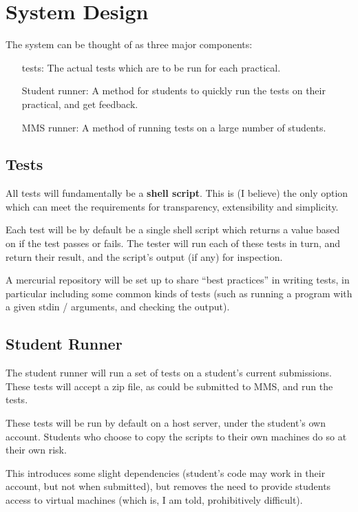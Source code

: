 \documentclass[11pt]{article}
\begin{document}
\section{System Design}

The system can be thought of as three major components:

\begin{itemize}
\item[tests:] The actual tests which are to be run for each practical.
\item[Student runner:] A method for students to quickly run the tests on their practical, and get feedback.
\item[MMS runner:] A method of running tests on a large number of students.
\end{itemize}



\subsection{Tests}

All tests will fundamentally be a \textbf{shell script}. This is (I believe) the only option which can meet the requirements for transparency, extensibility and simplicity.

Each test will be by default be a single shell script which returns a value based on if the test passes or fails. The tester will run each of these tests in turn, and return their result, and the script's output (if any) for inspection.

A mercurial repository will be set up to share ``best practices'' in writing tests, in particular including some common kinds of tests (such as running a program with a given stdin / arguments, and checking the output).

\subsection{Student Runner}

The student runner will run a set of tests on a student's current submissions. These tests will accept a zip file, as could be submitted to MMS, and run the tests.

These tests will be run by default on a host server, under the student's own account. Students who choose to copy the scripts to their own machines do so at their own risk.

This introduces some slight dependencies (student's code may work in their account, but not when submitted), but removes the need to provide students access to virtual machines (which is, I am told, prohibitively difficult).
\end{document}
